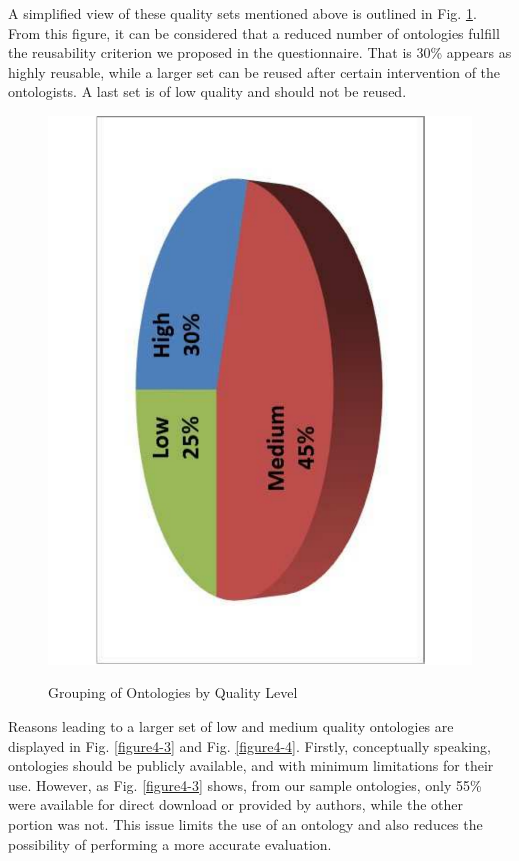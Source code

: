A simplified view of these quality sets mentioned above is outlined in Fig. \ref{figure4-2}. From this figure, it can be considered that a reduced number of ontologies fulfill the reusability criterion we proposed in the questionnaire.  That is 30\% appears as highly reusable, while a larger set can be reused   after certain intervention of the ontologists. A last set is of low quality and should not be reused. 


\begin{figure}
	\begin{center}
		\includegraphics[scale=0.4, angle=-90]{figure-chapterIV/fig4-2.pdf}\\
		\caption{Grouping of Ontologies by Quality Level}
		\label{figure4-2}
	\end{center}
\end{figure}



Reasons leading to a larger set of low and medium quality ontologies are displayed in Fig. \ref{figure4-3} and Fig. \ref{figure4-4}. Firstly, conceptually speaking, ontologies should be publicly available, and with minimum limitations for their use.  However, as Fig. \ref{figure4-3} shows, from our sample ontologies, only 55\% were available for direct download or provided by authors, while the other portion was not. This issue limits the use of an ontology and also reduces the possibility of performing a more accurate evaluation. 



